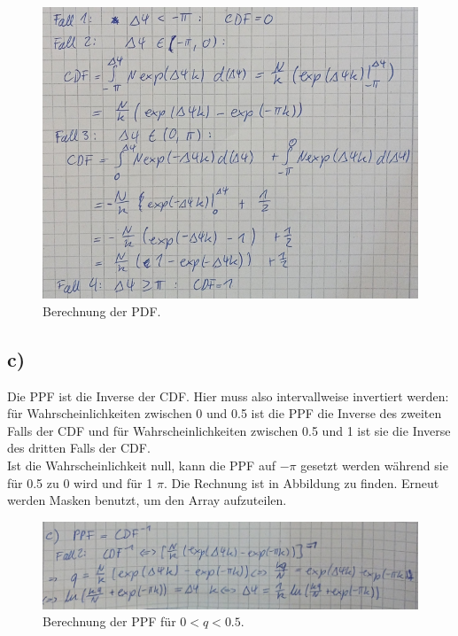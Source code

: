     \begin{figure}
        \centering
        \includegraphics[width=\textwidth]{b.png}
        \caption{Berechnung der PDF.}
        \label{fig:be}
    \end{figure}
    \FloatBarrier

\subsection{c)}
    Die PPF ist die Inverse der CDF. Hier muss also intervallweise invertiert werden: für Wahrscheinlichkeiten zwischen 0 und 0.5 ist die PPF die Inverse des zweiten Falls 
    der CDF und für Wahrscheinlichkeiten zwischen 0.5 und 1 ist sie die Inverse des dritten Falls der CDF.\\
    Ist die Wahrscheinlichkeit null, kann die PPF auf $-\pi$ gesetzt werden während sie für 0.5 zu 0 wird und für 1 $\pi$. Die Rechnung ist in Abbildung zu finden. Erneut werden 
    Masken benutzt, um den Array aufzuteilen.

    \begin{figure}
        \centering
        \includegraphics[width=\textwidth]{c1.png}
        \caption{Berechnung der PPF für $0 < q < 0.5$.}
        \label{fig:falleins}
    \end{figure}
    \FloatBarrier

